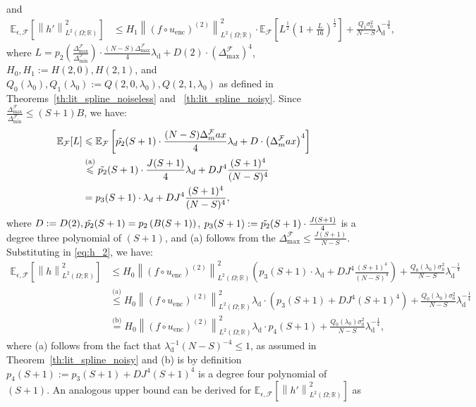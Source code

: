 \documentclass{article}
\def\encs{u_\textrm{enc}}
\def\declamb{\lambda_\textrm{d}}
\def\stset{\mathcal{F}}
\newcommand{\norm}[1]{\left\lVert#1\right\rVert}
\newcommand{\lp}[1]{{L}^{#1}\left(\Omega; \mathbb{R}\right)}
\newcommand{\lec}[2]{\stackrel{\text{#1}}{#2}}
\begin{document}
and 
\begin{align}\label{eq:hp_2}
    \mathbb{E}_{\epsilon, \stset}\left[\norm{h'}^2_{\lp{2}}\right] &\lec{}{\leqslant}H_1\norm{(f\circ\encs)^{(2)}}^2_{\lp{2}}\cdot\mathbb{E}_{\stset}\left[L^{\frac{1}{2}}(1 + \frac{L}{16})^{\frac{1}{2}}\right] + \frac{Q_1\sigma_0^2}{N-S}\declamb^{-\frac{3}{4}},
\end{align}
where $L=p_2\left(\frac{\Delta^\stset_\textrm{max}}{\Delta^\stset_\textrm{min}}\right)\cdot\frac{(N-S) \Delta^\stset_\textrm{max}}{4} \declamb + D(2)\cdot \left({\Delta^\stset_\textrm{max}}\right)^{4}$, $H_0, H_1 := H(2,0), H(2,1)$, and $Q_0(\lambda_0), Q_1(\lambda_0):=Q(2,0,\lambda_0), Q(2,1,\lambda_0)$ as defined in  Theorems~\ref{th:lit_spline_noiseless} and ~\ref{th:lit_spline_noisy}. 
Since $\frac{\Delta^\stset_\textrm{max}}{\Delta^\stset_\textrm{min}} \leqslant (S+1)B$, we have:
\begin{align}\label{eq:bound_L_2}
    \mathbb{E}_{\stset}[L] &\leqslant \mathbb{E}_{\stset}\left[\Tilde{p_2}(S+1)\cdot\frac{(N-S) \Delta^\stset_\textrm{max}}{4} \declamb + D\cdot \left({\Delta^\stset_\textrm{max}}\right)^{4} \right] 
    \nonumber \\ 
    &\lec{(a)}{\leqslant} \Tilde{p_2}(S+1)\cdot\frac{J(S+1)}{4} \declamb + DJ^4\frac{(S+1)^4}{(N-S)^4} 
    \nonumber \\ 
    &\lec{}{=} p_3(S+1)\cdot\declamb + DJ^4\frac{(S+1)^4}{(N-S)^4},
\end{align}
where $D:=D(2), \Tilde{p_2}(S+1) = p_2\left(B(S+1)\right)$, $p_3(S+1) := \Tilde{p_2}(S+1)\cdot\frac{J(S+1)}{4}$ is a degree three polynomial of $(S+1)$, and (a) follows from the  $\Delta^\stset_\textrm{max} \leqslant \frac{J(S+1)}{N-S}$. Substituting in \eqref{eq:h_2}, we have:
\begin{align}\label{eq:bound_h_2}
    \mathbb{E}_{\epsilon, \stset}\left[\norm{h}^2_{\lp{2}}\right] &\lec{}{\leqslant}H_0\norm{(f\circ\encs)^{(2)}}^2_{\lp{2}} 
    \left(p_3(S+1)\cdot\declamb + DJ^4\frac{(S+1)^4}{(N-S)^4}\right) + \frac{Q_0(\lambda_0)\sigma_0^2}{N-S}\declamb^{-\frac{1}{4}} \nonumber \\ 
    &\lec{(a)}{\leqslant} H_0\norm{(f\circ\encs)^{(2)}}^2_{\lp{2}}\declamb\cdot 
    \left(p_3(S+1) + DJ^4(S+1)^4\right) + \frac{Q_0(\lambda_0)\sigma_0^2}{N-S}\declamb^{-\frac{1}{4}} \nonumber \\ &\lec{(b)}{=} H_0\norm{(f\circ\encs)^{(2)}}^2_{\lp{2}}\declamb\cdot 
    p_4(S+1) + \frac{Q_0(\lambda_0)\sigma_0^2}{N-S}\declamb^{-\frac{1}{4}},
\end{align}
where (a) follows from the fact that $\declamb^{-1} (N-S)^{-4} \leqslant 1$, as assumed in Theorem~\ref{th:lit_spline_noisy} and (b) is by definition $p_4(S+1) := p_3(S+1) + DJ^4(S+1)^4$ is a degree four polynomial of $(S+1)$. An analogous upper bound can be derived for $\mathbb{E}_{\epsilon, \stset}\left[\norm{h'}^2_{\lp{2}}\right]$ as
\end{document}
